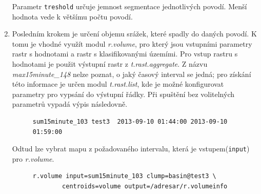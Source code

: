 \documentclass[a4paper,12pt,oneside]{report}
\begin{document}
\begin{enumerate}
Parametr \texttt{treshold} určuje jemnost segmentace jednotlivých
povodí. Menší hodnota vede k většímu počtu povodí.

\item Posledním krokem je určení objemu srážek, které spadly do daných
  povodí. K tomu je vhodné využít modul \textit{r.volume}, pro který
  jsou vstupními parametry rastr s hodnotami a rastr s klasifikovanými
  územími. Pro vstup rastru s hodnotami je použit výstupní rastr z
  \textit{t.rast.aggregate}. Z názvu \textit{max15minute\_148} nelze
  poznat, o jaký časový interval se jedná; pro získání této informace
  je určen modul \textit{t.rast.list}, kde je možné konfigurovat
  parametry pro vypsání do výstupní řádky. Při spuštění bez
  volitelných parametrů vypadá výpis následovně.

\begin{figure}[h!]
\begin{footnotesize}
\lstset{extendedchars=false,
escapeinside=''}
\begin{lstlisting}[style=mybash]
sum15minute_103	test3  2013-09-10 01:44:00 2013-09-10 01:59:00
\end{lstlisting}
\end{footnotesize} 
\end{figure}

Odtud lze vybrat mapu z požadovaného intervalu, která je vstupem(\texttt{input}) pro \textit{r.volume}. 

\begin{figure}[h!]
\begin{footnotesize}
\lstset{extendedchars=false,
escapeinside=''}
\begin{lstlisting}[style=mybash]
r.volume input=sum15minute_103 clump=basin@test3 \
        centroids=volume output=/adresar/r.volumeinfo
\end{lstlisting}
\end{footnotesize} 
\end{figure}



\end{enumerate} 
\end{document}
